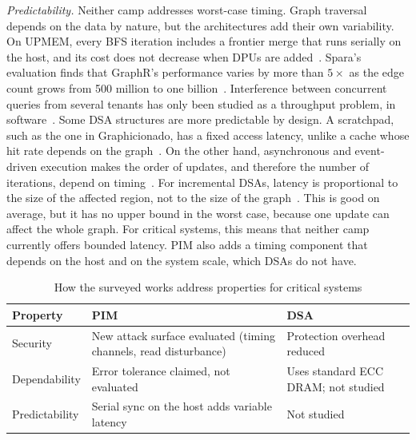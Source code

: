 \documentclass[journal,onecolumn]{IEEEtran}
\begin{document}
\emph{Predictability.} Neither camp addresses worst-case timing. Graph traversal depends on the data by nature, but the architectures add their own variability. On UPMEM, every BFS iteration includes a frontier merge that runs serially on the host, and its cost does not decrease when DPUs are added~\cite{gomezluna2022prim}. Spara's evaluation finds that GraphR's performance varies by more than $5\times$ as the edge count grows from 500 million to one billion~\cite{zheng2020spara}. Interference between concurrent queries from several tenants has only been studied as a throughput problem, in software~\cite{yin2023glign}. Some DSA structures are more predictable by design. A scratchpad, such as the one in Graphicionado, has a fixed access latency, unlike a cache whose hit rate depends on the graph~\cite{ham2016graphicionado}. On the other hand, asynchronous and event-driven execution makes the order of updates, and therefore the number of iterations, depend on timing~\cite{rahman2021jetstream,zhuo2019graphq}. For incremental DSAs, latency is proportional to the size of the affected region, not to the size of the graph~\cite{rahman2021jetstream,zhao2022tdgraph}. This is good on average, but it has no upper bound in the worst case, because one update can affect the whole graph. For critical systems, this means that neither camp currently offers bounded latency. PIM also adds a timing component that depends on the host and on the system scale, which DSAs do not have.

\begin{table}[t]
\caption{How the surveyed works address properties for critical systems}
\label{tab:critical}
\centering\footnotesize
\begin{tabularx}{\columnwidth}{@{}L{2.6cm}YY@{}}
\toprule
Property & PIM & DSA \\
\midrule
Security & New attack surface evaluated (timing channels, read disturbance)~\cite{bostanci2025impact,yuksel2026pid} & Protection overhead reduced~\cite{hua2022mgx} \\
Dependability & Error tolerance claimed, not evaluated~\cite{song2018graphr} & Uses standard ECC DRAM; not studied \\
Predictability & Serial sync on the host adds variable latency~\cite{gomezluna2022prim} & Not studied \\
\bottomrule
\end{tabularx}
\end{table}

\end{document}
